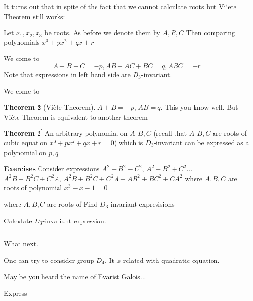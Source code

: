 It turns out that in spite of the fact that we cannot calculate roots but Vi`ete Theorem still works:

  Let $x_1,x_2,x_3$ be roots. As before we denote them by $A,B,C$ Then comparing polynomials $x^3+px^2+qx+r$

We come to
            $$
         A+B+C=-p, AB+AC+BC=q, ABC=-r
            $$
Note that expressions in left hand side are $D_3$-invariant.

  We come to

 {\bf Theorem 2} (Vi\`ete Theorem). $A+B=-p$, $AB=q$. This you know well. But Vi\`ete Theorem
  is  equivalent to another theorem

  \smallskip

  {\bf Theorem $2^\prime$} An arbitrary polynomial on $A,B,C$ (recall that $A,B,C$
  are roots of cubic equation $x^3+px^2+qx+r=0$)
      which is $D_3$-invariant can be expressed as a polynomial on $p,q$


 {\bf Exercises} Consider expressions $A^2+B^2-C^2$, $A^2+B^2+C^2$... $A^2B+B^2C+C^2A$,
   $A^2B+B^2C+C^2A+AB^2+BC^2+CA^2$ where $A,B,C$ are roots of polynomial $x^3-x-1=0$

 where $A,B,C$ are roots of
   Find $D_3$-invariant expresisions

   Calculate $D_3$-invariant expression.


    $$ $$

    What next.


     One can try to consider group $D_4$. It is related with quadratic equation.

      May be you heard the name of Evarist Galois...

    Express




\bye
